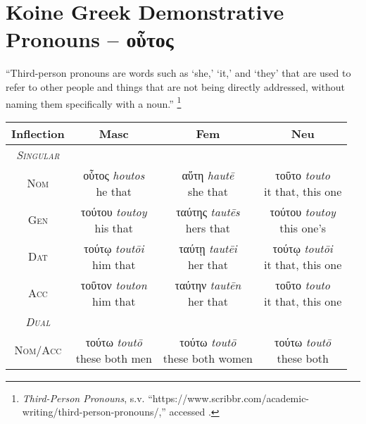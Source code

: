 \documentclass[10pt]{memoir}
\newcommand{\tsc}[1]{\textsc{#1}}
\newcommand{\grc}[1]{\fontspec{Inter}#1}
\newcommand{\trc}[1]{\textit{\fontspec{Tinos}#1}}
\newcommand{\linkfoot}[3]{\footnote{\emph{#1}, s.v. ``{#2},'' accessed \printdate{#3}.}}
\begin{document}
    \section*{Koine Greek Demonstrative Pronouns -- \grc{οὗτος}}

    ``Third-person pronouns are words such as `she,' `it,' and `they' that are used to refer to other people and things that are not being directly addressed, without naming them specifically with a noun.''
    \linkfoot{Third-Person Pronouns}{https://www.scribbr.com/academic-writing/third-person-pronouns/}{2025-05-13}

    \begin{table}[H]
        \begin{tabular}{c|ccc}
            \textbf{Inflection} & \textbf{Masc} & \textbf{Fem} & \textbf{Neu} \\
            \hline
            \emph{\tsc{Singular}} \\
            \tsc{Nom} & \makecell{\grc{οὗτος} \trc{houtos} \\ \small he that} & \makecell{\grc{αὕτη} \trc{hautē} \\ \small she that} & \makecell{\grc{τοῦτο} \trc{touto} \\ \small it that, this one} \\
            \tsc{Gen} & \makecell{\grc{τούτου} \trc{toutoy} \\ \small his that} & \makecell{\grc{ταύτης} \trc{tautēs} \\ \small hers that} & \makecell{\grc{τούτου} \trc{toutoy} \\ \small this one's} \\
            \tsc{Dat} & \makecell{\grc{τούτῳ} \trc{toutōi} \\ \small him that} & \makecell{\grc{ταύτῃ} \trc{tautēi} \\ \small her that} & \makecell{\grc{τούτῳ} \trc{toutōi} \\ \small it that, this one} \\
            \tsc{Acc} & \makecell{\grc{τοῦτον} \trc{touton} \\ \small him that} & \makecell{\grc{ταύτην} \trc{tautēn} \\ \small her that} & \makecell{\grc{τοῦτο} \trc{touto} \\ \small it that, this one} \\
            \hline
            \emph{\tsc{Dual}} \\
            \tsc{Nom/Acc} & \makecell{\grc{τούτω} \trc{toutō} \\ \small these both men} & \makecell{\grc{τούτω} \trc{toutō} \\ \small these both women} & \makecell{\grc{τούτω} \trc{toutō} \\ \small these both} \\

\end{tabular}
\end{table}
\end{document}
